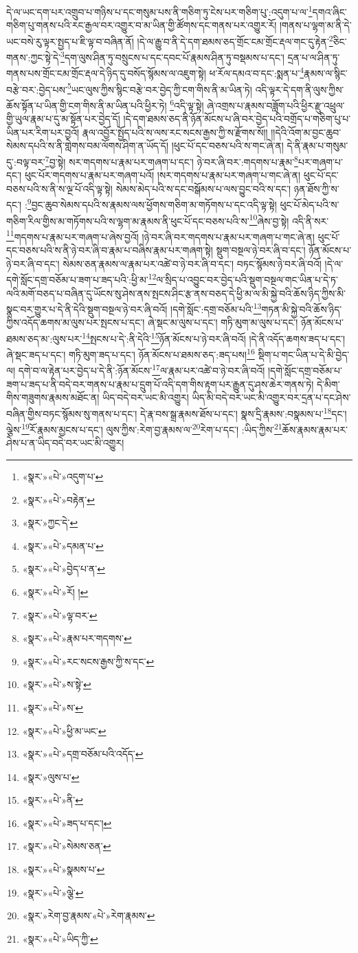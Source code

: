 དེ་ལ་ཡང་དག་པར་འགྲུབ་པ་གཉིས་པ་དང་གསུམ་པས་ནི་གཅིག་ཏུ་ངེས་པར་གཅིག་པུ་:འདུག་པ་ལ་\footnote{«སྣར་»«པེ་»འདུག་པ་}དགའ་ཞིང་གཅིག་པུ་གནས་པའི་རང་རྒྱལ་བར་འགྱུར་བ་མ་ཡིན་གྱི་ཚོགས་དང་གནས་པར་འགྱུར་རོ། །གནས་པ་ལྷག་མ་ནི་དེ་ཡང་བསེ་རུ་ལྟར་སྤྱད་པ་ཇི་ལྟ་བ་བཞིན་ནོ། །དེ་ལ་རྒྱུ་བ་ནི་དེ་དག་ཐམས་ཅད་གྲོང་ངམ་གྲོང་རྡལ་གང་དུ་རྟེན་\footnote{«སྣར་»«པེ་»བརྟེན་}ཅིང་གནས་:ཀྱང་སྟེ་དེ་\footnote{«སྣར་»ཀྱང་དེ་}དག་ལུས་ཤིན་ཏུ་བསྲུངས་པ་དང་དབང་པོ་རྣམས་ཤིན་ཏུ་བསྡམས་པ་དང་། དྲན་པ་ལ་ཤིན་ཏུ་གནས་པས་གྲོང་ངམ་གྲོང་རྡལ་དེ་ཉིད་དུ་བསོད་སྙོམས་ལ་འཇུག་སྟེ། ཕ་རོལ་དམའ་བ་དང་:སྨན་པ་\footnote{«སྣར་»«པེ་»དམན་པ་}རྣམས་ལ་སྙིང་བརྩེ་བར་:བྱེད་པས་\footnote{«སྣར་»«པེ་»བྱེད་པ་ན་}ཡང་ལུས་ཀྱིས་སྙིང་བརྩེ་བར་བྱེད་ཀྱི་ངག་གིས་ནི་མ་ཡིན་ཏེ། འདི་ལྟར་དེ་དག་ནི་ལུས་ཀྱིས་ཆོས་སྟོན་པ་ཡིན་གྱི་ངག་གིས་ནི་མ་ཡིན་པའི་ཕྱིར་ཏེ། \footnote{«སྣར་»«པེ་»རོ། ། }འདི་ལྟ་སྟེ། ཞེ་འགྲས་པ་རྣམས་བཟློག་པའི་ཕྱིར་རྫུ་འཕྲུལ་གྱི་ཡུལ་རྣམ་པ་དུ་མ་སྟོན་པར་བྱེད་དོ། །དེ་དག་ཐམས་ཅད་ནི་ཉོན་མོངས་པ་ཞི་བར་བྱེད་པའི་བགྲོད་པ་གཅིག་པུ་པ་ཡིན་པར་རིག་པར་བྱའོ། རྣལ་འབྱོར་སྤྱོད་པའི་ས་ལས་རང་སངས་རྒྱས་ཀྱི་ས་རྫོགས་སོ།། །།དེའི་འོག་མ་བྱང་ཆུབ་སེམས་དཔའི་ས་ནི་གླེགས་བམ་ལོགས་ཤིག་ན་ཡོད་དོ། །ཕུང་པོ་དང་བཅས་པའི་ས་གང་ཞེ་ན། དེ་ནི་རྣམ་པ་གསུམ་དུ་:བལྟ་བར་\footnote{«སྣར་»«པེ་»ལྟ་བར་}བྱ་སྟེ། སར་གདགས་པ་རྣམ་པར་གཞག་པ་དང་། ཉེ་བར་ཞི་བར་:གདགས་པ་རྣམ་\footnote{«སྣར་»«པེ་»རྣམ་པར་གདགས་}པར་གཞག་པ་དང་། ཕུང་པོར་གདགས་པ་རྣམ་པར་གཞག་པའོ། །སར་གདགས་པ་རྣམ་པར་གཞག་པ་གང་ཞེ་ན། ཕུང་པོ་དང་བཅས་པའི་ས་ནི་ས་ལྔ་པོ་འདི་ལྟ་སྟེ། སེམས་མེད་པའི་ས་དང་བསྒོམས་པ་ལས་བྱུང་བའི་ས་དང་། ཉན་ཐོས་ཀྱི་ས་དང་། :\footnote{«སྣར་»«པེ་»རང་སངས་རྒྱས་ཀྱི་ས་དང་}བྱང་ཆུབ་སེམས་དཔའི་ས་རྣམས་ལས་ཕྱོགས་གཅིག་མ་གཏོགས་པ་དང་འདི་ལྟ་སྟེ། ཕུང་པོ་མེད་པའི་ས་གཅིག་རིལ་གྱིས་མ་གཏོགས་པའི་ས་ལྷག་མ་རྣམས་ནི་ཕུང་པོ་དང་བཅས་པའི་ས་\footnote{«སྣར་»«པེ་»ས་སྟེ་}ཞེས་བྱ་སྟེ། འདི་ནི་སར་\footnote{«སྣར་»«པེ་»ས་}གདགས་པ་རྣམ་པར་གཞག་པ་ཞེས་བྱའོ། །ཉེ་བར་ཞི་བར་གདགས་པ་རྣམ་པར་གཞག་པ་གང་ཞེ་ན། ཕུང་པོ་དང་བཅས་པའི་ས་ནི་ཉེ་བར་ཞི་བ་རྣམ་པ་བཞིས་རྣམ་པར་གཞག་སྟེ། སྡུག་བསྔལ་ཉེ་བར་ཞི་བ་དང་། ཉོན་མོངས་པ་ཉེ་བར་ཞི་བ་དང་། སེམས་ཅན་རྣམས་ལ་རྣམ་པར་འཚེ་བ་ཉེ་བར་ཞི་བ་དང་། བཏང་སྙོམས་ཉེ་བར་ཞི་བའོ། །དེ་ལ་དགེ་སློང་དགྲ་བཅོམ་པ་ཟག་པ་ཟད་པའི་:ཕྱི་མ་\footnote{«སྣར་»«པེ་»ཕྱི་མ་ཡང་}ལ་སྲིད་པ་འབྱུང་བར་བྱེད་པའི་སྡུག་བསྔལ་གང་ཡིན་པ་དེ་ཏ་ལའི་མགོ་བཅད་པ་བཞིན་དུ་ཡོངས་སུ་ཤེས་ནས་སྤངས་ཤིང་རྩ་ནས་བཅད་དེ་ཕྱི་མ་ལ་མི་སྐྱེ་བའི་ཆོས་ཉིད་ཀྱིས་མི་སྣང་བར་གྱུར་པ་དེ་ནི་དེའི་སྡུག་བསྔལ་ཉེ་བར་ཞི་བའོ། །དགེ་སློང་:དགྲ་བཅོམ་པའི་\footnote{«སྣར་»«པེ་»དགྲ་བཅོམ་པའི་འདོད་}གཏན་མི་སྐྱེ་བའི་ཆོས་ཉིད་ཀྱིས་འདོད་ཆགས་མ་ལུས་པར་སྤངས་པ་དང་། ཞེ་སྡང་མ་ལུས་པ་དང་། གཏི་མུག་མ་ལུས་པ་དང་། ཉོན་མོངས་པ་ཐམས་ཅད་མ་:ལུས་པར་\footnote{«སྣར་»ལུས་པ་}སྤངས་པ་དེ་:ནི་དེའི་\footnote{«སྣར་»«པེ་»ནི་}ཉོན་མོངས་པ་ཉེ་བར་ཞི་བའོ། །དེ་ནི་འདོད་ཆགས་ཟད་པ་དང་། ཞེ་སྡང་ཟད་པ་དང་། གཏི་མུག་ཟད་པ་དང་། ཉོན་མོངས་པ་ཐམས་ཅད་:ཟད་པས།\footnote{«སྣར་»«པེ་»ཟད་པ་དང་།} སྡིག་པ་གང་ཡིན་པ་དེ་མི་བྱེད་ལ། དགེ་བ་ལ་རྟེན་པར་བྱེད་པ་དེ་ནི་:ཉོན་མོངས་\footnote{«སྣར་»«པེ་»སེམས་ཅན་}ལ་རྣམ་པར་འཚེ་བ་ཉེ་བར་ཞི་བའོ། །དགེ་སློང་དགྲ་བཅོམ་པ་ཟག་པ་ཟད་པ་ནི་བདེ་བར་གནས་པ་རྣམ་པ་དྲུག་པོ་འདི་དག་གིས་རྟག་པར་རྒྱུན་དུ་ཤས་ཆེར་གནས་ཏེ། དེ་མིག་གིས་གཟུགས་རྣམས་མཐོང་ན། ཡིད་བདེ་བར་ཡང་མི་འགྱུར། ཡིད་མི་བདེ་བར་ཡང་མི་འགྱུར་བར་དྲན་པ་དང་ཤེས་བཞིན་གྱིས་བཏང་སྙོམས་སུ་གནས་པ་དང་། དེ་རྣ་བས་སྒྲ་རྣམས་ཐོས་པ་དང་། སྣས་དྲི་རྣམས་:བསྣམས་པ་\footnote{«སྣར་»«པེ་»སྣམས་པ་}དང་། ལྕེས་\footnote{«སྣར་»«པེ་»ལྕེ་}རོ་རྣམས་མྱངས་པ་དང་། ལུས་ཀྱིས་:རེག་བྱ་རྣམས་ལ་\footnote{«སྣར་»རེག་བྱ་རྣམས་«པེ་»རེག་རྣམས་}རེག་པ་དང་། :ཡིད་ཀྱིས་\footnote{«སྣར་»«པེ་»ཡིད་ཀྱི་}ཆོས་རྣམས་རྣམ་པར་ཤེས་པ་ན་ཡིད་བདེ་བར་ཡང་མི་འགྱུར། 